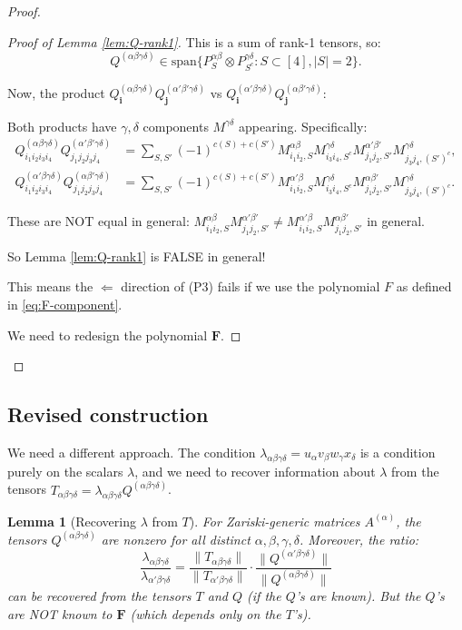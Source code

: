 \documentclass[12pt]{article}
\newtheorem{lemma}[theorem]{Lemma}
\begin{document}
\begin{proof}
\begin{proof}[Proof of Lemma \ref{lem:Q-rank1}]
This is a sum of rank-1 tensors, so:
\[
Q^{(\alpha\beta\gamma\delta)} \in \mathrm{span}\{P^{\alpha\beta}_S \otimes P^{\gamma\delta}_{S^c} : S \subset [4], |S| = 2\}.
\]

Now, the product $Q^{(\alpha\beta\gamma\delta)}_\mathbf{i} Q^{(\alpha'\beta'\gamma\delta)}_\mathbf{j}$ vs $Q^{(\alpha'\beta\gamma\delta)}_\mathbf{i} Q^{(\alpha\beta'\gamma\delta)}_\mathbf{j}$:

Both products have $\gamma, \delta$ components $M^{\gamma\delta}$ appearing. Specifically:
\begin{align*}
Q^{(\alpha\beta\gamma\delta)}_{i_1 i_2 i_3 i_4} Q^{(\alpha'\beta'\gamma\delta)}_{j_1 j_2 j_3 j_4} &= \sum_{S, S'} (-1)^{c(S)+c(S')} M^{\alpha\beta}_{i_1i_2,S} M^{\gamma\delta}_{i_3i_4,S^c} M^{\alpha'\beta'}_{j_1j_2,S'} M^{\gamma\delta}_{j_3j_4,(S')^c}, \\
Q^{(\alpha'\beta\gamma\delta)}_{i_1 i_2 i_3 i_4} Q^{(\alpha\beta'\gamma\delta)}_{j_1 j_2 j_3 j_4} &= \sum_{S,S'} (-1)^{c(S)+c(S')} M^{\alpha'\beta}_{i_1i_2,S} M^{\gamma\delta}_{i_3i_4,S^c} M^{\alpha\beta'}_{j_1j_2,S'} M^{\gamma\delta}_{j_3j_4,(S')^c}.
\end{align*}

These are NOT equal in general: $M^{\alpha\beta}_{i_1i_2,S} M^{\alpha'\beta'}_{j_1j_2,S'} \neq M^{\alpha'\beta}_{i_1i_2,S} M^{\alpha\beta'}_{j_1j_2,S'}$ in general.

So Lemma \ref{lem:Q-rank1} is FALSE in general!

This means the $\Leftarrow$ direction of (P3) fails if we use the polynomial $F$ as defined in \eqref{eq:F-component}.

We need to redesign the polynomial $\mathbf{F}$.
\end{proof}

\end{proof}

\subsection{Revised construction}

We need a different approach. The condition $\lambda_{\alpha\beta\gamma\delta} = u_\alpha v_\beta w_\gamma x_\delta$ is a condition purely on the scalars $\lambda$, and we need to recover information about $\lambda$ from the tensors $T_{\alpha\beta\gamma\delta} = \lambda_{\alpha\beta\gamma\delta} Q^{(\alpha\beta\gamma\delta)}$.

\begin{lemma}[Recovering $\lambda$ from $T$]\label{lem:recover-lambda}
For Zariski-generic matrices $A^{(\alpha)}$, the tensors $Q^{(\alpha\beta\gamma\delta)}$ are nonzero for all distinct $\alpha, \beta, \gamma, \delta$. Moreover, the ratio:
\[
\frac{\lambda_{\alpha\beta\gamma\delta}}{\lambda_{\alpha'\beta\gamma\delta}} = \frac{\|T_{\alpha\beta\gamma\delta}\|}{\|T_{\alpha'\beta\gamma\delta}\|} \cdot \frac{\|Q^{(\alpha'\beta\gamma\delta)}\|}{\|Q^{(\alpha\beta\gamma\delta)}\|}
\]
can be recovered from the tensors $T$ and $Q$ (if the $Q$'s are known). But the $Q$'s are NOT known to $\mathbf{F}$ (which depends only on the $T$'s).
\end{lemma}
\end{document}
